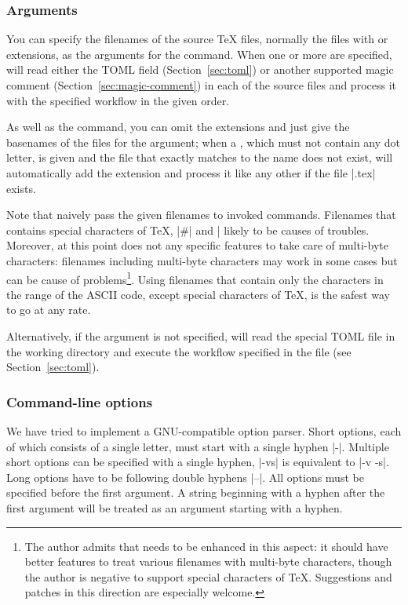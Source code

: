 \documentclass[draft]{llmk-doc}
\begin{document}
\subsubsection*{Arguments }

You can specify the filenames of the source {\TeX} files, normally the files
with  or  extensions, as the arguments for the 
command. When one or more  are specified,  will read
either the TOML field (Section~\ref{sec:toml}) or another supported magic
comment (Section~\ref{sec:magic-comment}) in each of the source files and
process it with the specified workflow in the given order.

As well as the  command, you can omit the  extensions and
just give the basenames of the files for the argument; when a ,
which must not contain any dot letter, is given and the file that exactly
matches to the name does not exist,  will automatically add the
 extension and process it like any other if the file
|.tex| exists.

Note that  naively pass the given filenames to invoked commands.
Filenames that contains special characters of {\TeX}, \eg |#| and |%
likely to be causes of troubles. Moreover, at this point  does not
any specific features to take care of multi-byte characters: filenames
including multi-byte characters may work in some cases but can be cause of
problems\footnote{The author admits that  needs to be enhanced in
this aspect: it should have better features to treat various filenames with
multi-byte characters, though the author is negative to support special
characters of {\TeX}. Suggestions and patches in this direction are especially
welcome.}. Using filenames that contain only the characters in the range of the
ASCII code, except special characters of {\TeX}, is the safest way to go at any
rate.

Alternatively, if the argument is not specified,  will read the
special TOML file  in the working directory and execute the
workflow specified in the file (see Section~\ref{sec:toml}).

\subsubsection*{Command-line options }

We have tried to implement a GNU-compatible option parser. Short options, each of
which consists of a single letter, must start with a single hyphen |-|.
Multiple short options can be specified with a single hyphen, \eg |-vs| is
equivalent to |-v -s|. Long options have to be following double hyphens |--|.
All options must be specified before the first argument. A string beginning
with a hyphen after the first argument will be treated as an argument starting
with a hyphen.
\end{document}
